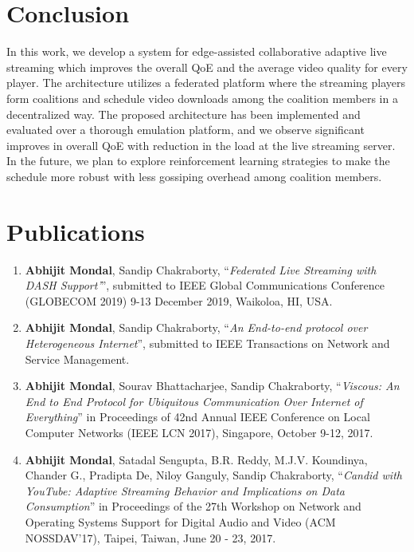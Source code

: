 \section{Conclusion}
In this work, we develop a system for edge-assisted collaborative adaptive live streaming which improves the overall QoE and the average video quality for every player. The architecture utilizes a federated platform where the streaming players form coalitions and schedule video downloads among the coalition members in a decentralized way. The proposed architecture has been implemented and evaluated over a thorough emulation platform, and we observe significant improves in overall QoE with reduction in the load at the live streaming server. In the future, we plan to explore reinforcement learning strategies to make the schedule more robust with less gossiping overhead among coalition members. 

\section*{Publications}

\begin{enumerate}[label=\arabic*.]
	\item \textbf{Abhijit Mondal}, Sandip Chakraborty, ``\textit{Federated Live Streaming with DASH Support'}'', submitted to IEEE Global Communications Conference (GLOBECOM 2019) 9-13 December 2019, Waikoloa, HI, USA.
	\item \textbf{Abhijit Mondal}, Sandip Chakraborty, ``\textit{An End-to-end protocol over Heterogeneous Internet}'', submitted to IEEE Transactions on Network and Service Management.
	\item \textbf{Abhijit Mondal}, Sourav Bhattacharjee, Sandip Chakraborty, ``\textit{Viscous: An End to End Protocol for Ubiquitous Communication Over Internet of Everything}'' in Proceedings of 42nd Annual IEEE Conference on Local Computer Networks (IEEE LCN 2017), Singapore, October 9-12, 2017.
	\item \textbf{Abhijit Mondal}, Satadal Sengupta, B.R. Reddy, M.J.V. Koundinya, Chander G., Pradipta De, Niloy Ganguly, Sandip Chakraborty, ``\textit{Candid with YouTube: Adaptive Streaming Behavior and Implications on Data Consumption}'' in Proceedings of the 27th Workshop on Network and Operating Systems Support for Digital Audio and Video (ACM NOSSDAV'17), Taipei, Taiwan, June 20 - 23, 2017.
\end{enumerate}

